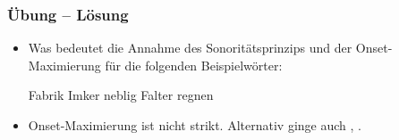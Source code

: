 

\begin{frame}
\frametitle{Übung -- Lösung}

\begin{itemize}
	\item Was bedeutet die Annahme des Sonoritätsprinzips und der Onset-Maximierung für die folgenden Beispielwörter:
	
	\eal
	\settowidth{}
	\ex Fabrik
	\ex Imker
	\ex neblig
	\ex Falter
	\ex regnen
	
	
	\zl
	
	\item<8-> Onset-Maximierung ist nicht strikt. Alternativ ginge auch \textipa{[ne:p.lI\c{c}]}, \textipa{[\textscr e:k.n@n]}.
	
\end{itemize}

\end{frame}	

